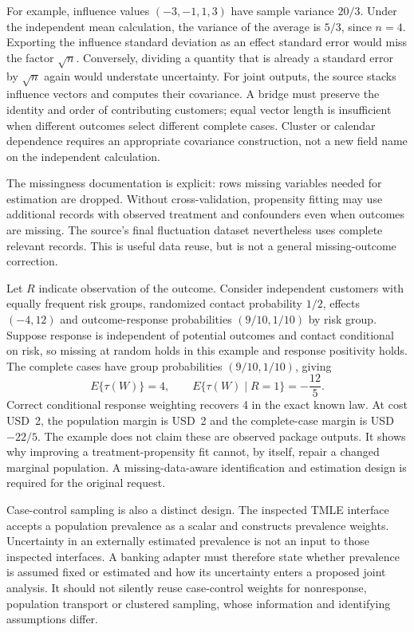 For example, influence values $(-3,-1,1,3)$ have sample variance $20/3$.
Under the independent mean calculation, the variance of the average is
$5/3$, since $n=4$. Exporting the influence standard deviation as an effect
standard error would miss the factor $\sqrt n$. Conversely, dividing a
quantity that is already a standard error by $\sqrt n$ again would understate
uncertainty. For joint outputs, the source stacks influence vectors and
computes their covariance. A bridge must preserve the identity and order
of contributing customers; equal vector length is insufficient when
different outcomes select different complete cases. Cluster or calendar
dependence requires an appropriate covariance construction, not a new field
name on the independent calculation. \citep{exec21_effects_tmle,exec21_effects_reference}

The missingness documentation is explicit: rows missing variables needed
for estimation are dropped. Without cross-validation, propensity fitting
may use additional records with observed treatment and confounders even
when outcomes are missing. The source's final fluctuation dataset nevertheless
uses complete relevant records. This is useful data reuse, but is not a
general missing-outcome correction. \citep{exec21_effects_tmle}

Let $R$ indicate observation of the outcome. Consider independent customers
with equally frequent risk groups, randomized contact probability $1/2$,
effects $(-4,12)$ and outcome-response probabilities $(9/10,1/10)$ by risk
group. Suppose response is independent of potential outcomes and contact
conditional on risk, so missing at random holds in this example and response
positivity holds. The complete cases have group probabilities $(9/10,1/10)$,
giving
\begin{equation}
\label{exec21:effects-response}
 E\{\tau(W)\}=4,\qquad
 E\{\tau(W)\mid R=1\}=-\frac{12}{5}.
\end{equation}
Correct conditional response weighting recovers 4 in the exact known law.
At cost USD~2, the population margin is USD~2 and the complete-case margin
is USD~$-22/5$. The example does not claim these are observed package
outputs. It shows why improving a treatment-propensity fit cannot, by
itself, repair a changed marginal population. A missing-data-aware
identification and estimation design is required for the original request.
\citep{exec21_effects_reference}

Case-control sampling is also a distinct design. The inspected TMLE
interface accepts a population prevalence as a scalar and constructs
prevalence weights. Uncertainty in an externally estimated prevalence is
not an input to those inspected interfaces. A banking adapter must therefore
state whether prevalence is assumed fixed or estimated and how its
uncertainty enters a proposed joint analysis. It should not silently reuse
case-control weights for nonresponse, population transport or clustered
sampling, whose information and identifying assumptions differ.
\citep{exec21_effects_tmle}

